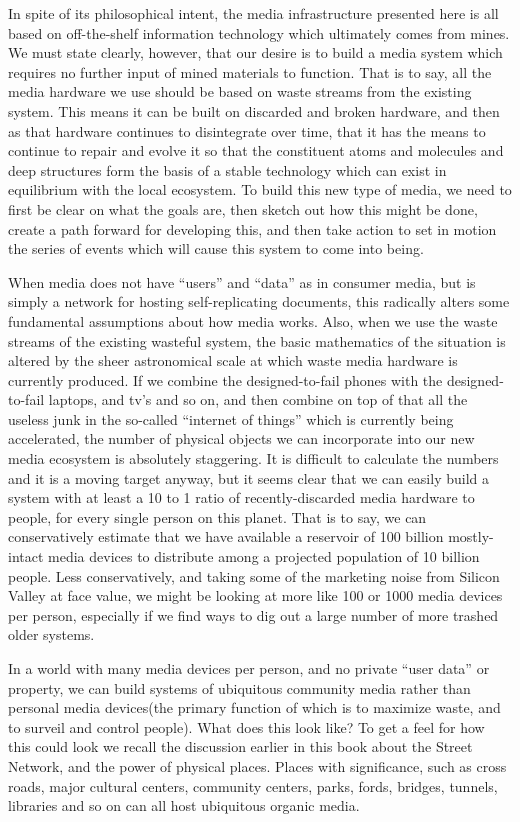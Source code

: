 

In spite of its philosophical intent, the media infrastructure presented here is all based on off-the-shelf information technology which ultimately comes from mines.  We must state clearly, however, that our desire is to build a media system which requires no further input of mined materials to function.  That is to say, all the media hardware we use should be based on waste streams from the existing system.  This means it can be built on discarded and broken hardware, and then as that hardware continues to disintegrate over time, that it has the means to continue to repair and evolve it so that the constituent atoms and molecules and deep structures form the basis of a stable technology which can exist in equilibrium with the local ecosystem. To build this new type of media, we need to first be clear on what the goals are, then sketch out how this might be done, create a path forward for developing this, and then take action to set in motion the series of events which will cause this system to come into being. 

When media does not have ``users'' and ``data'' as in consumer media, but is simply a network for hosting self-replicating documents, this radically alters some fundamental assumptions about how media works.  Also, when we use the waste streams of the existing wasteful system, the basic mathematics of the situation is altered by the sheer astronomical scale at which waste media hardware is currently produced. If we combine the designed-to-fail phones with the designed-to-fail laptops, and tv's and so on, and then combine on top of that all the useless junk in the so-called ``internet of things'' which is currently being accelerated, the number of physical objects we can incorporate into our new media ecosystem is absolutely staggering.  It is difficult to calculate the numbers and it is a moving target anyway, but it seems clear that we can easily build a system with at least a 10 to 1 ratio of recently-discarded media hardware to people, for every single person on this planet.  That is to say, we can conservatively estimate that we have available a reservoir of 100 billion mostly-intact media devices to distribute among a projected population of 10 billion people.  Less conservatively, and taking some of the marketing noise from Silicon Valley at face value, we might be looking at more like 100 or 1000 media devices per person, especially if we find ways to dig out a large number of more trashed older systems.

In a world with many media devices per person, and no private ``user data'' or property, we can build systems of ubiquitous community media rather than personal media devices(the primary function of which is to maximize waste, and to surveil and control people).  What does this look like?  To get a feel for how this could look we recall the discussion earlier in this book about the Street Network, and the power of physical places.  Places with significance, such as cross roads, major cultural centers, community centers, parks, fords, bridges, tunnels, libraries and so on can all host ubiquitous organic media.  

